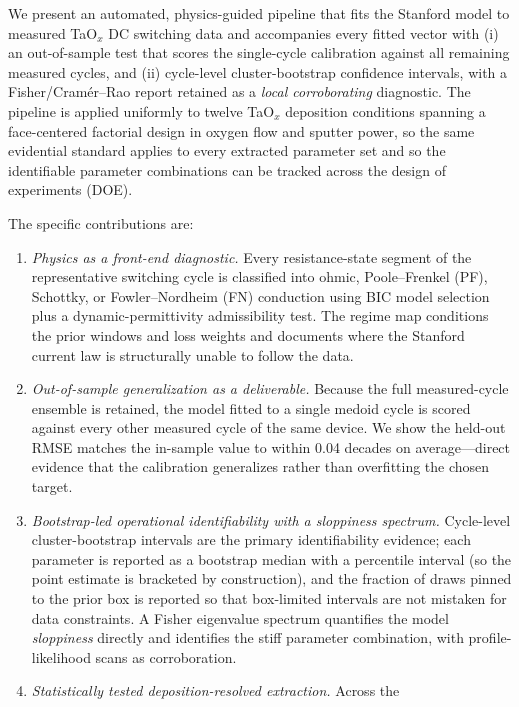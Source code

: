 \documentclass[journal]{IEEEtran}
\begin{document}
We present an automated, physics-guided pipeline that fits the Stanford model
to measured TaO$_x$ DC switching data and accompanies every fitted vector
with (i) an out-of-sample test that scores the single-cycle calibration
against all remaining measured cycles, and (ii) cycle-level cluster-bootstrap
confidence intervals, with a Fisher/Cram\'er--Rao report retained as a
\emph{local corroborating} diagnostic.  The pipeline is applied uniformly to
twelve TaO$_x$ deposition conditions spanning a face-centered factorial
design in oxygen flow and sputter power, so the same evidential standard
applies to every extracted parameter set and so the identifiable parameter
combinations can be tracked across the design of experiments (DOE).

The specific contributions are:
\begin{enumerate}
  \item \emph{Physics as a front-end diagnostic.}  Every resistance-state
        segment of the representative switching cycle is classified into
        ohmic, Poole--Frenkel (PF), Schottky, or Fowler--Nordheim (FN)
        conduction using BIC model selection plus a dynamic-permittivity
        admissibility test.  The regime map conditions the prior windows and
        loss weights and documents where the Stanford current law is
        structurally unable to follow the data.
  \item \emph{Out-of-sample generalization as a deliverable.}  Because the
        full measured-cycle ensemble is retained, the model fitted to a single
        medoid cycle is scored against every other measured cycle of the same
        device.  We show the held-out RMSE matches the in-sample value to
        within 0.04 decades on average---direct evidence that the calibration
        generalizes rather than overfitting the chosen target.
  \item \emph{Bootstrap-led operational identifiability with a sloppiness
        spectrum.}  Cycle-level cluster-bootstrap intervals are the primary
        identifiability evidence; each parameter is reported as a bootstrap
        median with a percentile interval (so the point estimate is bracketed
        by construction), and the fraction of draws pinned to the prior box is
        reported so that box-limited intervals are not mistaken for data
        constraints.  A Fisher eigenvalue spectrum quantifies the model
        \emph{sloppiness} directly and identifies the stiff parameter
        combination, with profile-likelihood scans as corroboration.
  \item \emph{Statistically tested deposition-resolved extraction.}  Across the

\end{enumerate}
\end{document}
